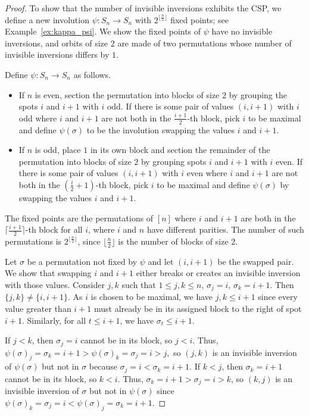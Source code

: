 \documentclass[10pt,a4paper]{amsart}
\begin{document}
\begin{proof}
  To show that the number of invisible inversions exhibits the CSP, we define a new involution $\psi: S_n \rightarrow S_n$ with $2^{\lfloor\frac{n}{2} \rfloor}$ fixed points; see Example~\ref{ex:kappa_psi}. We show the fixed points of $\psi$ have no invisible inversions, and orbits of size $2$ are made of two permutations whose number of invisible inversions differs by $1$. 

Define $\psi: S_n \rightarrow S_n$ as follows.

\begin{itemize}

    \item If $n$ is even, section the permutation into blocks of size $2$ by grouping the spots $i$ and $i + 1$ with $i$ odd. If there is some pair of values $(i, i+1)$ with $i$ odd where $i$ and $i + 1$ are not both in the $\frac{i+1}{2}$-th block, pick $i$ to be maximal and define $\psi(\sigma)$ to be the involution swapping the values $i$ and $i + 1$.

    \item If $n$ is odd, place $1$ in its own block and section the remainder of the permutation into blocks of size $2$ by grouping spots $i$ and $i + 1$ with $i$ even.  If there is some pair of values $(i, i+1)$ with $i$ even where $i$ and $i + 1$ are not both in the $\left(\frac{i}{2} + 1\right)$-th block, pick $i$ to be maximal and define $\psi(\sigma)$ by swapping the values $i$ and $i + 1$.

\end{itemize}
The fixed points are the permutations of $[n]$ where $i$ and $i+1$ are both in the $\lceil \frac{i+1}{2}\rceil$-th block for all $i$, where $i$ and $n$ have different parities. The number of such permutations is $2^{\lfloor\frac{n}{2} \rfloor}$, since ${\lfloor\frac{n}{2} \rfloor}$ is the number of blocks of size $2$.
  
  Let $\sigma$ be a permutation not fixed by $\psi$ and let $(i, i + 1)$ be the swapped pair. We show that swapping $i$ and $i + 1$ either breaks or creates an invisible inversion with those values. Consider $j, k$ such that $1 \leq j, k \leq n$, $\sigma_j = i$, $\sigma_k = i + 1$. Then $\{j , k\} \neq \{i, i+1 \}$. As $i$ is chosen to be maximal, we have $j, k \leq i+ 1$ since every value greater than $i + 1$ must already be in its assigned block to the right of spot $i + 1$. Similarly, for all $t \leq i + 1$, we have $\sigma_t \leq i + 1$.

  If $j < k$, then $\sigma_ j = i$ cannot be in its block, so $j < i$. Thus, $\psi(\sigma)_j = \sigma_k = i + 1 > \psi(\sigma)_k = \sigma_j = i > j,$ so $(j, k)$ is an invisible inversion of $\psi(\sigma)$ but not in $\sigma$ because $\sigma_j = i < \sigma_k = i + 1$. If $k < j$, then $\sigma_k = i + 1$ cannot be in its block, so $k < i$. Thus, $\sigma_k = i + 1 > \sigma_j = i > k$, so $(k , j)$ is an invisible inversion of $\sigma$ but not in $\psi(\sigma)$ since $\psi(\sigma)_k = \sigma_j = i < \psi(\sigma)_j = \sigma_k = i +1$.


\end{proof}
\end{document}
